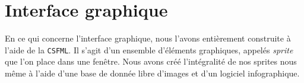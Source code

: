 \section*{Interface graphique}

	En ce qui concerne l'interface graphique, nous l'avons entièrement construite à l'aide de la \texttt{CSFML}. Il s'agit d'un ensemble d'éléments graphiques, appelés \textit{sprite} que l'on place dans une fenêtre. Nous avons créé l'intégralité de nos sprites nous même à l'aide d'une base de donnée libre d'images et d'un logiciel infographique. \\

\vspace{0.5cm}


